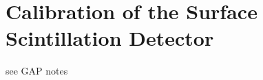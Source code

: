 
\chapter{Calibration of the Surface Scintillation Detector}
\label{chap:ssd-calibration}

see GAP notes
